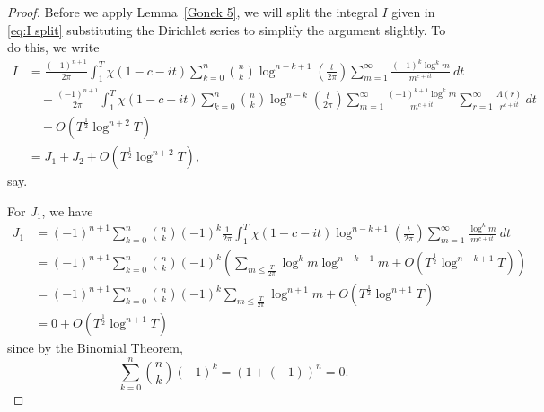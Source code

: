 \documentclass[12pt,a4paper,reqno]{amsart}
\theoremstyle{remark}
\numberwithin{equation}{section}
\begin{document}
\begin{proof}
Before we apply Lemma~\ref{Gonek 5}, we will split the integral $I$ given in \eqref{eq:I split} substituting the Dirichlet series to simplify the argument slightly. To do this, we write
\begin{align*}
I &= \frac{(-1)^{n+1}}{2 \pi } \int_{1}^{T} \chi (1 - c - it) \sum_{k=0}^n \binom{n}{k} \log^{n-k+1} \left( \frac{t}{2 \pi} \right) \sum_{m=1}^{\infty} \frac{(-1)^k \log^k m}{m^{c + it}} \ dt \\
& \quad +\frac{(-1)^{n+1}}{2 \pi } \int_{1}^{T} \chi (1 - c - it) \sum_{k=0}^n \binom{n}{k} \log^{n-k} \left( \frac{t}{2 \pi} \right) \sum_{m=1}^{\infty} \frac{(-1)^{k+1} \log^k m}{m^{c + it}} \sum_{r=1}^{\infty} \frac{\Lambda (r)}{r^{c+it}} \ dt \\
& \quad + O(T^{\frac{1}{2}} \log^{n+2} T) \\
&= J_1 + J_2 +O(T^{\frac{1}{2}} \log^{n+2} T),
\end{align*}
say.

For $J_1$, we have
\begin{align*}
J_1 &= (-1)^{n+1}\sum_{k=0}^n \binom{n}{k} (-1)^k  \frac{1}{2 \pi } \int_{1}^{T} \chi (1 - c - it) \log^{n-k+1} \left( \frac{t}{2 \pi} \right) \sum_{m=1}^{\infty} \frac{ \log^k m}{m^{c + it}} \ dt \\
&= (-1)^{n+1} \sum_{k=0}^n \binom{n}{k} (-1)^k \left( \sum_{m \leq \frac{T}{2 \pi}} \log^k m \log^{n-k+1} m +O(T^{\frac{1}{2}}\log^{n-k+1} T) \right)\\
&= (-1)^{n+1} \sum_{k=0}^n \binom{n}{k} (-1)^k \sum_{m \leq \frac{T}{2 \pi}} \log^{n+1} m + O(T^{\frac{1}{2}}\log^{n+1} T) \\
&=0 + O(T^{\frac{1}{2}}\log^{n+1} T)
\end{align*}
since by the Binomial Theorem,
\[
\sum_{k=0}^n \binom{n}{k} (-1)^k = (1 + (-1))^n = 0.
\]


\end{proof}
\end{document}
